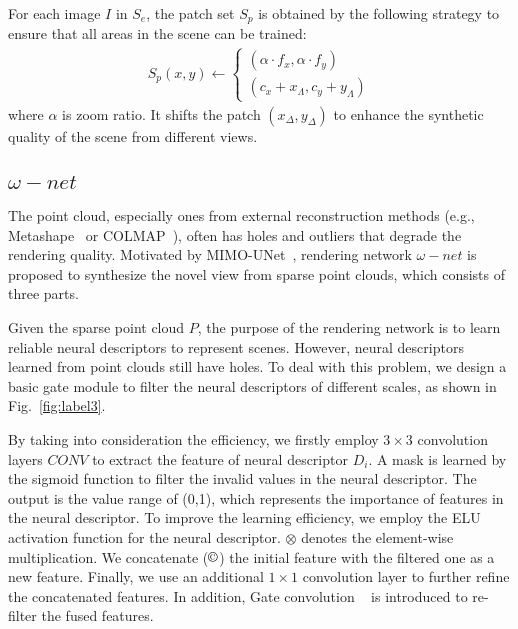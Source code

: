\documentclass[sigconf]{acmart}
\begin{document}
For each image $I$ in $S_e$, the patch set $S_p$ is obtained by the following strategy to ensure that all areas in the scene can be trained:
\begin{equation}
\begin{gathered}
S_{p}(x, y) \leftarrow \begin{cases}\left(\alpha \cdot f_{x}, \alpha \cdot f_{y}\right) \\
\left(c_{x}+x_{\Lambda}, c_{y}+y_{\Lambda}\right)\end{cases}  
\end{gathered}
\end{equation}
where $\alpha$ is zoom ratio. It shifts the patch $(x_{\Delta},y_{\Delta})$ to enhance the synthetic quality of the scene from different views.





\subsection{ $\omega-net$}
The point cloud, especially ones from external reconstruction methods (e.g., Metashape~\cite{Metashape} or COLMAP~\cite{schonberger2016structure}), often has holes and outliers that degrade the rendering quality. Motivated by MIMO-UNet~\cite{cho2021rethinking}, rendering network $\omega-net$ is proposed to synthesize the novel view from sparse point clouds, which consists of three parts.
  
Given the sparse point cloud $P$, the purpose of the rendering network is to learn reliable neural descriptors to represent scenes. However, neural descriptors learned from point clouds still have holes. To deal with this problem, we design a basic gate module to filter the neural descriptors of different scales, as shown in Fig.~\ref{fig:label3}.
 
By taking into consideration the efficiency, we firstly employ $3 \times 3$ convolution layers $CONV$ to extract the feature of neural descriptor $D_{i}$. A mask is learned by the sigmoid function to filter the invalid values in the neural descriptor. The output is the value range of (0,1), which represents the importance of features in the neural descriptor. To improve the learning efficiency, we employ the ELU activation function for the neural descriptor. $\otimes$ denotes the element-wise multiplication. We concatenate ($\copyright$) the initial feature with the filtered one as a new feature. Finally, we use an additional $1\times1$ convolution layer to further refine the concatenated features. In addition, Gate convolution ~\cite{yu2019free} is introduced to re-filter the fused features.
 
\end{document}
